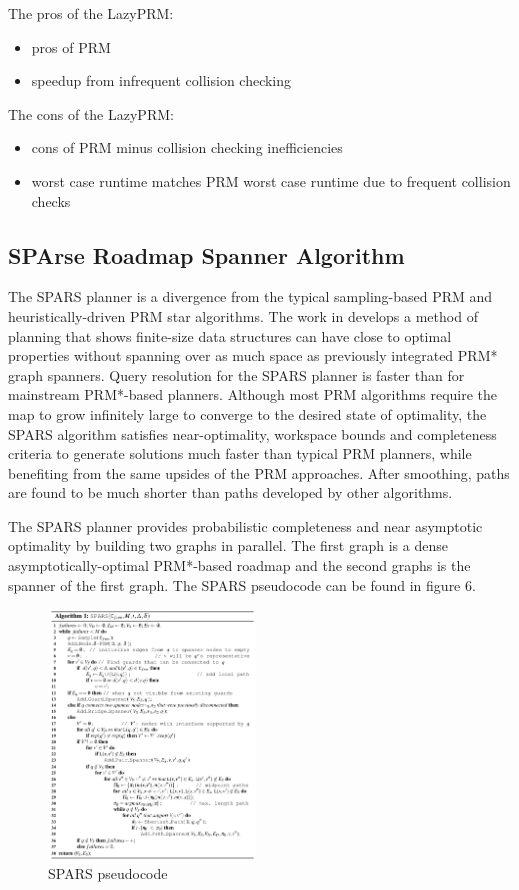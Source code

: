 \documentclass[conference]{IEEEtran} \usepackage[T1]{fontenc} \usepackage[backend=biber, style=ieee]{biblatex}
\begin{document}
The pros of the LazyPRM:
\begin{itemize}
\item pros of PRM
\item speedup from infrequent collision checking
\end{itemize}

The cons of the LazyPRM:
\begin{itemize}
\item cons of PRM minus collision checking inefficiencies
\item worst case runtime matches PRM worst case runtime due to frequent collision checks
\end{itemize}

\subsection{SPArse Roadmap Spanner Algorithm} \label{SPARS}
The SPARS planner is a divergence from the typical sampling-based PRM and heuristically-driven PRM star algorithms. The work in \cite{spars} develops a method of planning 
that shows finite-size data structures can have close to optimal properties without spanning over as much space as previously integrated PRM* graph spanners. Query
resolution for the SPARS planner is faster than for mainstream PRM*-based planners. Although most PRM algorithms require the map to grow infinitely large to converge to 
the desired state of optimality, the SPARS algorithm satisfies near-optimality, workspace bounds and completeness criteria to generate solutions much faster than typical
PRM planners, while benefiting from the same upsides of the PRM approaches. After smoothing, paths are found to be much shorter than paths developed by other algorithms.

The SPARS planner provides probabilistic completeness and near asymptotic optimality by building two graphs in parallel. The first graph is a dense asymptotically-optimal
PRM*-based roadmap and the second graphs is the spanner of the first graph. The SPARS pseudocode can be found in figure 6.

\begin{figure}
\label{figure6} 
\centering 
\includegraphics[width=0.49\textwidth]{spars}
\caption{SPARS pseudocode}
\end{figure}
\end{document}
